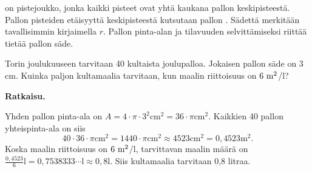  on pistejoukko, jonka kaikki pisteet ovat yhtä kaukana pallon keskipisteestä. Pallon pisteiden etäisyyttä keskipisteestä kutsutaan pallon . Sädettä merkitään tavallisimmin kirjaimella $r$. Pallon pinta-alan ja tilavuuden selvittämiseksi riittää tietää pallon säde.


\begin{esimerkki}
Torin joulukuuseen tarvitaan 40 kultaista joulupalloa. Jokaisen pallon säde on 3 cm. Kuinka paljon kultamaalia tarvitaan, kun maalin riittoisuus on $6~\textnormal{m}^2$/l?

\textbf{Ratkaisu.}

Yhden pallon pinta-ala on $A= 4 \cdot \pi \cdot 3^2 \text{cm}^2=36\cdot \pi \text{cm}^2$. Kaikkien 40 pallon yhteispinta-ala on siis
$$40 \cdot 36 \cdot \pi \text{cm}^2 = 1440 \cdot \pi \text{cm}^2 \approx 4523 \text{cm}^2 =0,4523 \text{m}^2.$$
Koska maalin riittoisuus on $6~\textnormal{m}^2$/l, tarvittavan maalin määrä on $\frac{0,4523}{6}\text{l}=0,7538333 \cdots \text{l} \approx 0,8\text{l}$.
Siis kultamaalia tarvitaan 0,8 litraa.
\end{esimerkki}

